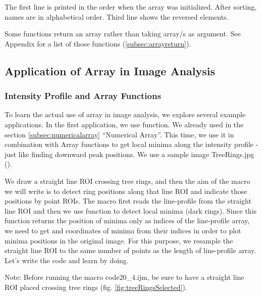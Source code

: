 The first line is printed in the order when the array was initialized. After
sorting, names are in alphabetical order. Third line shows the reversed
elements.

Some functions return an array rather than taking array/s as argument. See Appendix for a list of those functions (\ref{subsec:arrayreturn}).

\subsection{Application of Array in Image Analysis}

\subsubsection{Intensity Profile and Array Functions}

To learn the actual use of array in image analysis, we explore several example applications. In the first application, we use  function. We already used  in the section \ref{subsec:numericalarray} ``Numerical Array''. This time, we use it in combination with Array functions to get local minima along the intensity profile - just like finding downward peak positions. We use a sample image Tree\textunderscore Rings.jpg ().

We draw a straight line ROI crossing tree rings, and then the aim of the macro we will write is to detect ring positions along that line ROI and indicate those positions by point ROIs. The macro first reads the line-profile from the straight line ROI and then we use  function to detect local minima (dark rings). Since this function returns the position of minima only as indices of the line-profile array, we need to get  and  coordinates of minima from their indices in order to plot minima positions in the original image. For this purpose, we resample the straight line ROI to the same number of points as the length of line-profile array. Let's write the code and learn by doing.

Note: Before running the macro code20\_4.ijm, be sure to have a straight line ROI placed crossing tree rings (fig. \ref{fig:treeRingsSelected}).